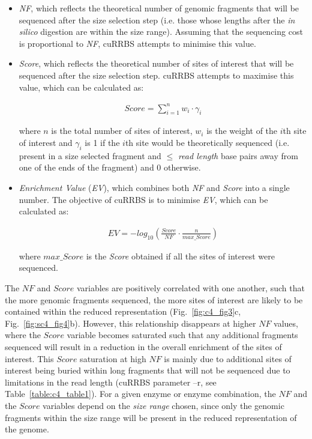 \begin{itemize}
	
	\item \textit{\acrshort{NF}}, which reflects the theoretical number of genomic fragments that will be sequenced after the size selection step (i.e. those whose lengths after the \textit{in silico} digestion are within the size range). Assuming that the sequencing cost is proportional to \textit{NF}, cuRRBS attempts to minimise this value.
	
	\item \textit{Score}, which reflects the theoretical number of sites of interest that will be sequenced after the size selection step. cuRRBS attempts to maximise this value, which can be calculated as:
	
	\begin{align}
	Score = \sum_{i=1}^{n} w_i \cdot \gamma_i
	\end{align}
	
	where $n$ is the total number of sites of interest, $w_i$ is the weight of the $i$th site of interest and $\gamma_i$ is 1 if the $i$th site would be theoretically sequenced (i.e. present in a size selected fragment and $\leq$ \textit{read length} base pairs away from one of the ends of the fragment) and 0 otherwise.
	
	\item \textit{Enrichment Value} (\textit{\acrshort{EV}}), which combines both \textit{NF} and \textit{Score} into a single number. The objective of cuRRBS is to minimise \textit{EV}, which can be calculated as:
	
	\begin{align}
	EV = -log_{10} \left(\frac{Score}{NF} \cdot \frac{n}{max\_Score}\right)
	\end{align}

	where $max\_Score$ is the \textit{Score} obtained if all the sites of interest were sequenced.
	
\end{itemize}


The $NF$ and $Score$ variables are positively correlated with one another, such that the more genomic fragments sequenced, the more sites of interest are likely to be contained within the reduced representation (Fig.~\ref{fig:c4_fig3}c, Fig.~\ref{fig:sc4_fig4}b). However, this relationship disappears at higher $NF$ values, where the $Score$ variable becomes saturated such that any additional fragments sequenced will result in a reduction in the overall enrichment of the sites of interest. This $Score$ saturation at high $NF$ is mainly due to additional sites of interest being buried within long fragments that will not be sequenced due to limitations in the read length (cuRRBS parameter –r, see Table~\ref{table:c4_table1}). For a given enzyme or enzyme combination, the $NF$ and the $Score$ variables depend on the \textit{size range} chosen, since only the genomic fragments within the size range will be present in the reduced representation of the genome. 


